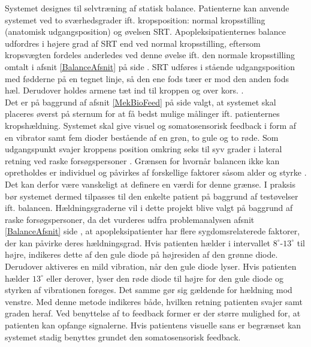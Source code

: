 Systemet designes til selvtræning af statisk balance. Patienterne kan anvende systemet ved to sværhedsgrader ift. kropsposition: normal kropsstilling (anatomisk udgangsposition) og øvelsen SRT. Apopleksipatienternes balance udfordres i højere grad af SRT end ved normal kropsstilling, eftersom kropsvægten fordeles anderledes ved denne øvelse ift. den normale kropsstilling omtalt i afsnit \ref{BalanceAfsnit} på side \pageref{BalanceAfsnit}. SRT udføres i stående udgangsposition med fødderne på en tegnet linje, så den ene fods tæer er mod den anden fods hæl. Derudover holdes armene tæt ind til kroppen og over kors. \cite{Huo1999}.\\ %
Det er på baggrund af afsnit \ref{MekBioFeed} på side \pageref{MekBioFeed} valgt, at systemet skal placeres øverst på sternum for at få bedst mulige målinger ift. patienternes kropshældning. Systemet skal give visuel og somatosensorisk feedback i form af en vibrator samt fem dioder bestående af en grøn, to gule og to røde. Som udgangspunkt svajer kroppens position omkring seks til syv grader i lateral retning ved raske forsøgspersoner %
\cite{Wang2010,Huo1999}. Grænsen for hvornår balancen ikke kan opretholdes er individuel og påvirkes af forskellige faktorer såsom alder og styrke \cite{Huo1999}. Det kan derfor være vanskeligt at definere en værdi for denne grænse. I praksis bør systemet dermed tilpasses til den enkelte patient på baggrund af testøvelser ift. balancen. Hældningsgraderne vil i dette projekt blive valgt på baggrund af raske forsøgspersoner, da det vurderes udfra problemanalysen afsnit \ref{BalanceAfsnit} side \pageref{BalanceAfsnit}, at apopleksipatienter har flere sygdomsrelaterede faktorer, der kan påvirke deres hældningsgrad. Hvis patienten hælder i intervallet $8^{\circ}$-$13^{\circ}$ til højre, indikeres dette af den gule diode på højresiden af den grønne diode. Derudover aktiveres en mild vibration, når den gule diode lyser. Hvis patienten hælder $13^{\circ}$ eller derover, lyser den røde diode til højre for den gule diode og styrken af vibrationen forøges. Det samme gør sig gældende for hældning mod venstre. Med denne metode indikeres både, hvilken retning patienten svajer samt graden heraf. Ved benyttelse af to feedback former er der større mulighed for, at patienten kan opfange signalerne. Hvis patientens visuelle sans er begrænset kan systemet stadig benyttes grundet den somatosensorisk feedback. \\ 
